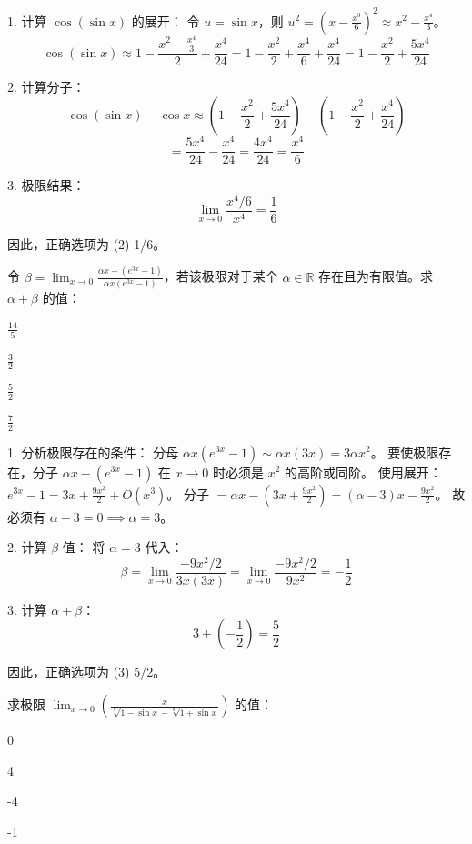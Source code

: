 \begin{questions}
\begin{solution}
1. 计算 $\cos(\sin x)$ 的展开：
令 $u = \sin x$，则 $u^2 = (x - \frac{x^3}{6})^2 \approx x^2 - \frac{x^4}{3}$。
\[ \cos(\sin x) \approx 1 - \frac{x^2 - \frac{x^4}{3}}{2} + \frac{x^4}{24} = 1 - \frac{x^2}{2} + \frac{x^4}{6} + \frac{x^4}{24} = 1 - \frac{x^2}{2} + \frac{5x^4}{24} \]

2. 计算分子：
\[ \cos(\sin x) - \cos x \approx (1 - \frac{x^2}{2} + \frac{5x^4}{24}) - (1 - \frac{x^2}{2} + \frac{x^4}{24}) \]
\[ = \frac{5x^4}{24} - \frac{x^4}{24} = \frac{4x^4}{24} = \frac{x^4}{6} \]

3. 极限结果：
\[ \lim_{x \to 0} \frac{x^4/6}{x^4} = \frac{1}{6} \]

因此，正确选项为 (2) 1/6。
\end{solution}

\question 
令 $\beta = \lim_{x \to 0} \frac{\alpha x - (e^{3x}-1)}{\alpha x(e^{3x}-1)}$，若该极限对于某个 $\alpha \in \mathbb{R}$ 存在且为有限值。求 $\alpha + \beta$ 的值：
\begin{choices}
    \item $\frac{14}{5}$
    \item $\frac{3}{2}$
    \item $\frac{5}{2}$
    \item $\frac{7}{2}$
\end{choices}

\begin{solution}
1. 分析极限存在的条件：
分母 $\alpha x(e^{3x}-1) \sim \alpha x(3x) = 3\alpha x^2$。
要使极限存在，分子 $\alpha x - (e^{3x}-1)$ 在 $x \to 0$ 时必须是 $x^2$ 的高阶或同阶。
使用展开：$e^{3x}-1 = 3x + \frac{9x^2}{2} + O(x^3)$。
分子 $= \alpha x - (3x + \frac{9x^2}{2}) = (\alpha - 3)x - \frac{9x^2}{2}$。
故必须有 $\alpha - 3 = 0 \implies \alpha = 3$。

2. 计算 $\beta$ 值：
将 $\alpha = 3$ 代入：
\[ \beta = \lim_{x \to 0} \frac{-9x^2/2}{3x(3x)} = \lim_{x \to 0} \frac{-9x^2/2}{9x^2} = -\frac{1}{2} \]

3. 计算 $\alpha + \beta$：
\[ 3 + (-\frac{1}{2}) = \frac{5}{2} \]

因此，正确选项为 (3) 5/2。
\end{solution}

\question 
求极限 $\lim_{x \to 0} \left( \frac{x}{\sqrt[8]{1-\sin x} - \sqrt[8]{1+\sin x}} \right)$ 的值：
\begin{choices}
    \item 0
    \item 4
    \item -4
    \item -1
\end{choices}


\end{questions}
